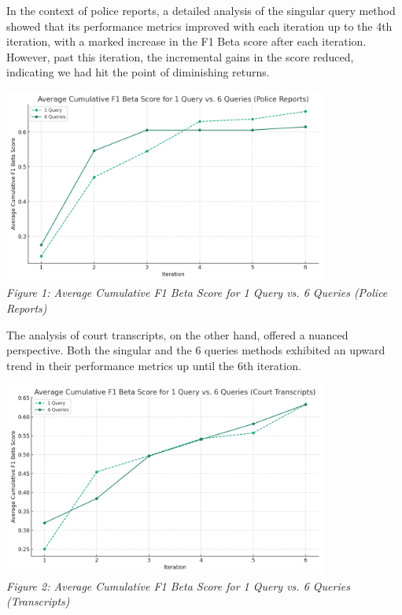 \documentclass{article}
\begin{document}
In the context of police reports, a detailed analysis of the singular query method showed that its performance metrics improved with each iteration up to the 4th iteration, with a marked increase in the F1 Beta score after each iteration. However, past this iteration, the incremental gains in the score reduced, indicating we had hit the point of diminishing returns.

\begin{center}
    \includegraphics[width=0.8\textwidth]{data/avg_cum_fbeta_police_reports.png}
    \\
    \textit{Figure 1: Average Cumulative F1 Beta Score for 1 Query vs. 6 Queries (Police Reports)}
\end{center}

The analysis of court transcripts, on the other hand, offered a nuanced perspective. Both the singular and the 6 queries methods exhibited an upward trend in their performance metrics up until the 6th iteration.

\begin{center}
    \includegraphics[width=0.8\textwidth]{data/avg_cum_fbeta_court_transcripts.png}
    \\
    \textit{Figure 2: Average Cumulative F1 Beta Score for 1 Query vs. 6 Queries (Transcripts)}
\end{center}
\end{document}

